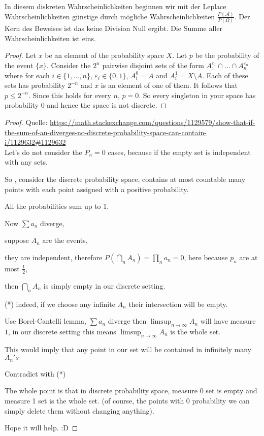 \documentclass[11pt]{article}
\newcommand{\A}{\mathcal{A}}
\newcommand{\Om}{\Omega}
\newenvironment{reflection}[2][Reflection]{\begin{trivlist}
\item[\hskip \labelsep {\bfseries #1}\hskip \labelsep {\bfseries #2.}]}{\end{trivlist}}
\begin{document}
\begin{reflection}{1.1a}
In diesem diskreten Wahrscheinlichkeiten beginnen wir mit der Leplace Wahrscheinlichkeiten günstige durch mögliche Wahrscheinlichkeiten $ \frac{P(\A)}{P(\Om)}$. Der Kern des Beweises ist das keine Division Null ergibt. Die Summe aller Wahrscheinlichkeiten ist eins.
\end{reflection}
\begin{proof}
Let $x$ be an element of the probability space $X$.  Let $p$ be the probability of the event $\{x\}$.  Consider the $2^n$ pairwise disjoint sets of the form
$A_1^{\varepsilon_1}\cap\dots\cap A_n^{\varepsilon_n}$ where for each $i\in\{1,\dots,n\}$, $\varepsilon_i\in\{0,1\}$, $A_i^0=A$ and $A^1_i=X\setminus A$.
Each of these sets has probability $2^{-n}$ and $x$ is an element of one of them.
It follows that $p\leq 2^{-n}$.  Since this holds for every $n$, $p=0$.
So every singleton in your space has probability $0$ and hence the space is not discrete.
\end{proof}

\begin{proof}
Quelle: \url{https://math.stackexchange.com/questions/1129579/show-that-if-the-sum-of-an-diverges-no-discrete-probability-space-can-contain-i/1129632#1129632}\\

Let's do not consider the $P_n=0$ cases, because if the empty set is independent with any sets.

So , consider the discrete probability space, contains at most countable many points with each point assigned with a positive probability.

All the probabilities sum up to 1.

Now $\sum a_n$ diverge,

suppose $A_n$ are the events,

they are independent, therefore $P(\bigcap_n A_n)=\prod_n a_n=0$, here because $p_n$ are at most $\frac{1}{2}$,

then $\bigcap_n A_n$ is simply empty in our discrete setting.

(*) indeed, if we choose any infinite $A_n$ their intersection will be empty.

Use Borel-Cantelli lemma, $\sum a_n$ diverge then $\limsup_{n\rightarrow\infty} A_n$ will have measure $1$, in our discrete setting this means $\limsup_{n\rightarrow\infty} A_n$ is the whole set.

This would imply that any point in our set will be contained in infinitely many $A_n's$

Contradict with (*)


The whole point is that in discrete probability space, measure 0 set is empty and measure 1 set is the whole set. (of course, the points with 0 probability we can simply delete them without changing anything).

Hope it will help. :D
\end{proof}
\end{document}
